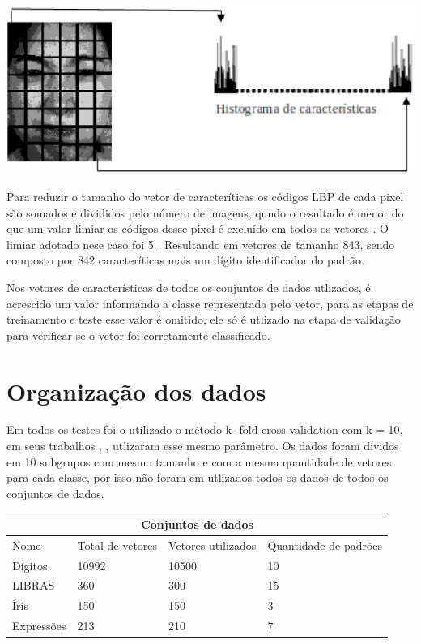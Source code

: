 \begin{itemize}
\begin{center}
	\includegraphics[scale=0.5]{graficos/histograma}
	\label{img:LBPHistograma}
\end{center}

Para reduzir o tamanho do vetor de caracteríticas os códigos LBP de cada pixel são somados e divididos pelo número de imagens, qundo o resultado é menor do que um valor limiar os códigos desse pixel é excluído em todos os vetores \cite{Feng}. O limiar adotado nese caso foi 5 \cite{LBPShan2009}. Resultando em vetores de tamanho 843, sendo composto por 842 caracteríticas mais um dígito identificador do padrão. 
\end{itemize}

Nos vetores de características de todos os conjuntos de dados utlizados, é acrescido um valor informando a classe representada pelo vetor, para as etapas de treinamento e teste esse valor é omitido, ele só é utlizado na etapa de validação para verificar se o vetor foi corretamente classificado.

\section{Organização dos dados}
Em todos os testes foi o utilizado o método k -fold cross validation com k = 10, em seus trabalhos , ,  utlizaram esse mesmo parâmetro. Os dados foram dividos em 10 subgrupos com mesmo tamanho \cite{Guo} e com a mesma quantidade de vetores para cada classe, por isso não foram em utlizados todos os dados de todos os conjuntos de dados.

\begin{center}
	\begin{tabular}{|p{2cm}|p{3cm}|p{2cm}|p{2cm}|}
        \hline
        \multicolumn{4}{|c|}{Conjuntos de dados} \\ \hline
        Nome & Total de vetores & Vetores utilizados & Quantidade de padrões\\ \hline
		Dígitos    &10992  & 10500 & 10\\ \hline
		LIBRAS     & 360   & 300   & 15\\ \hline
		Íris       & 150   & 150   & 3\\ \hline
		Expressões & 213   & 210   & 7\\ \hline
	\end{tabular}
	\label{table:org_dados}
\end{center}

